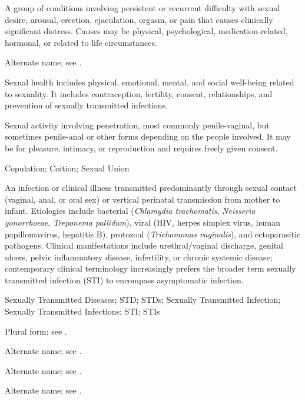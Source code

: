  A group of conditions involving persistent or recurrent difficulty with sexual desire, arousal, erection, ejaculation, orgasm, or pain that causes clinically significant distress. Causes may be physical, psychological, medication-related, hormonal, or related to life circumstances.

 Alternate name; see .

 Sexual health includes physical, emotional, mental, and social well-being related to sexuality. It includes contraception, fertility, consent, relationships, and prevention of sexually transmitted infections.

 Sexual activity involving penetration, most commonly penile-vaginal, but sometimes penile-anal or other forms depending on the people involved. It may be for pleasure, intimacy, or reproduction and requires freely given consent.

\synonyms
Copulation; Coition; Sexual Union

 An infection or clinical illness transmitted predominantly through sexual contact (vaginal, anal, or oral sex) or vertical perinatal transmission from mother to infant. Etiologies include bacterial (\textit{Chlamydia trachomatis}, \textit{Neisseria gonorrhoeae}, \textit{Treponema pallidum}), viral (HIV, herpes simplex virus, human papillomavirus, hepatitis B), protozoal (\textit{Trichomonas vaginalis}), and ectoparasitic pathogens. Clinical manifestations include urethral/vaginal discharge, genital ulcers, pelvic inflammatory disease, infertility, or chronic systemic disease; contemporary clinical terminology increasingly prefers the broader term sexually transmitted infection (STI) to encompass asymptomatic infection.

\synonyms
Sexually Transmitted Diseases; STD; STDs; Sexually Transmitted Infection; Sexually Transmitted Infections; STI; STIs

 Plural form; see .

 Alternate name; see .

 Alternate name; see .

 Alternate name; see .

